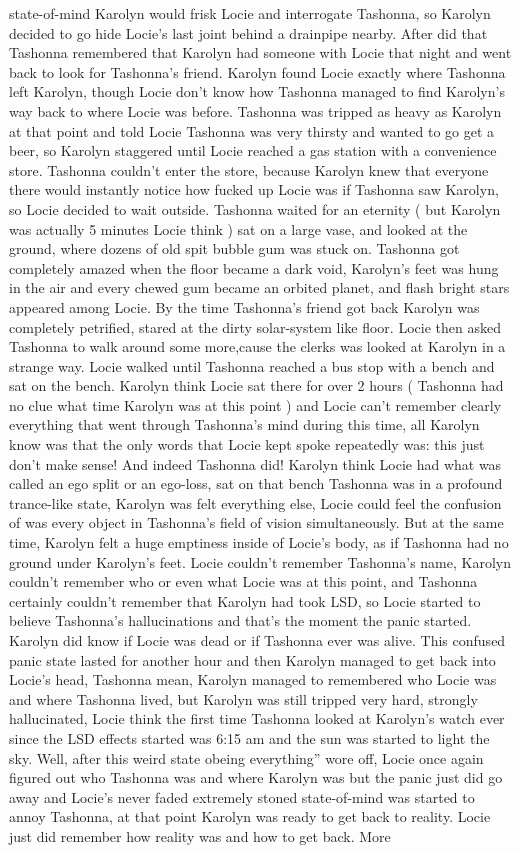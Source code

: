 \documentclass[12pt]{book}
\begin{document}
state-of-mind Karolyn would frisk Locie and interrogate Tashonna, so Karolyn decided to go hide Locie's last joint behind a drainpipe nearby. After did that Tashonna remembered that Karolyn had someone with Locie that night and went back to look for Tashonna's friend. Karolyn found Locie exactly where Tashonna left Karolyn, though Locie don't know how Tashonna managed to find Karolyn's way back to where Locie was before. Tashonna was tripped as heavy as Karolyn at that point and told Locie Tashonna was very thirsty and wanted to go get a beer, so Karolyn staggered until Locie reached a gas station with a convenience store. Tashonna couldn't enter the store, because Karolyn knew that everyone there would instantly notice how fucked up Locie was if Tashonna saw Karolyn, so Locie decided to wait outside. Tashonna waited for an eternity ( but Karolyn was actually 5 minutes Locie think ) sat on a large vase, and looked at the ground, where dozens of old spit bubble gum was stuck on. Tashonna got completely amazed when the floor became a dark void, Karolyn's feet was hung in the air and every chewed gum became an orbited planet, and flash bright stars appeared among Locie. By the time Tashonna's friend got back Karolyn was completely petrified, stared at the dirty solar-system like floor. Locie then asked Tashonna to walk around some more,cause the clerks was looked at Karolyn in a strange way. Locie walked until Tashonna reached a bus stop with a bench and sat on the bench. Karolyn think Locie sat there for over 2 hours ( Tashonna had no clue what time Karolyn was at this point ) and Locie can't remember clearly everything that went through Tashonna's mind during this time, all Karolyn know was that the only words that Locie kept spoke repeatedly was: this just don't make sense! And indeed Tashonna did! Karolyn think Locie had what was called an ego split or an ego-loss, sat on that bench Tashonna was in a profound trance-like state, Karolyn was felt everything else, Locie could feel the confusion of was every object in Tashonna's field of vision simultaneously. But at the same time, Karolyn felt a huge emptiness inside of Locie's body, as if Tashonna had no ground under Karolyn's feet. Locie couldn't remember Tashonna's name, Karolyn couldn't remember who or even what Locie was at this point, and Tashonna certainly couldn't remember that Karolyn had took LSD, so Locie started to believe Tashonna's hallucinations and that's the moment the panic started. Karolyn did know if Locie was dead or if Tashonna ever was alive. This confused panic state lasted for another hour and then Karolyn managed to get back into Locie's head, Tashonna mean, Karolyn managed to remembered who Locie was and where Tashonna lived, but Karolyn was still tripped very hard, strongly hallucinated, Locie think the first time Tashonna looked at Karolyn's watch ever since the LSD effects started was 6:15 am and the sun was started to light the sky. Well, after this weird state obeing everything'' wore off, Locie once again figured out who Tashonna was and where Karolyn was but the panic just did go away and Locie's never faded extremely stoned state-of-mind was started to annoy Tashonna, at that point Karolyn was ready to get back to reality. Locie just did remember how reality was and how to get back. More 
\end{document}
